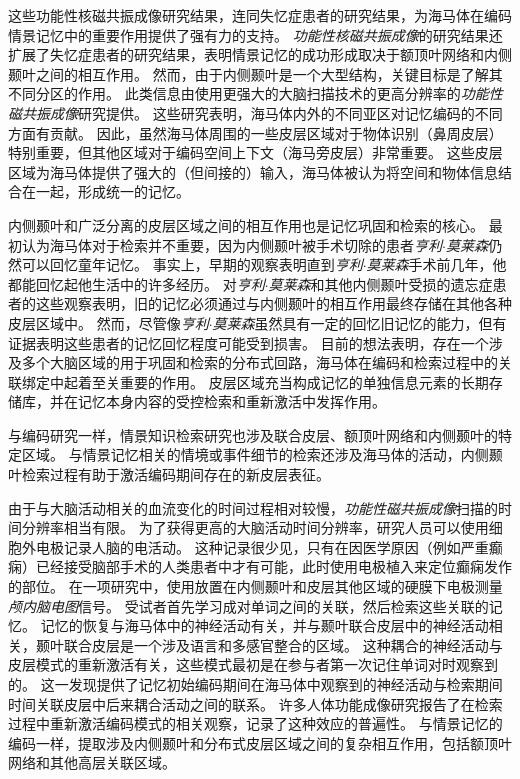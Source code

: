 这些功能性核磁共振成像研究结果，连同失忆症患者的研究结果，为海马体在编码情景记忆中的重要作用提供了强有力的支持。
\textit{功能性核磁共振成像}的研究结果还扩展了失忆症患者的研究结果，表明情景记忆的成功形成取决于额顶叶网络和内侧颞叶之间的相互作用。
然而，由于内侧颞叶是一个大型结构，关键目标是了解其不同分区的作用。
此类信息由使用更强大的大脑扫描技术的更高分辨率的\textit{功能性磁共振成像}研究提供。
这些研究表明，海马体内外的不同亚区对记忆编码的不同方面有贡献。
因此，虽然海马体周围的一些皮层区域对于物体识别（鼻周皮层）特别重要，但其他区域对于编码空间上下文（海马旁皮层）非常重要。
这些皮层区域为海马体提供了强大的（但间接的）输入，海马体被认为将空间和物体信息结合在一起，形成统一的记忆。


内侧颞叶和广泛分离的皮层区域之间的相互作用也是记忆巩固和检索的核心。
最初认为海马体对于检索并不重要，因为内侧颞叶被手术切除的患者\textit{亨利$\cdot$莫莱森}仍然可以回忆童年记忆。
事实上，早期的观察表明直到\textit{亨利$\cdot$莫莱森}手术前几年，他都能回忆起他生活中的许多经历。
对\textit{亨利$\cdot$莫莱森}和其他内侧颞叶受损的遗忘症患者的这些观察表明，旧的记忆必须通过与内侧颞叶的相互作用最终存储在其他各种皮层区域中。
然而，尽管像\textit{亨利$\cdot$莫莱森}虽然具有一定的回忆旧记忆的能力，但有证据表明这些患者的记忆回忆程度可能受到损害。
目前的想法表明，存在一个涉及多个大脑区域的用于巩固和检索的分布式回路，海马体在编码和检索过程中的关联绑定中起着至关重要的作用。
皮层区域充当构成记忆的单独信息元素的长期存储库，并在记忆本身内容的受控检索和重新激活中发挥作用。


与编码研究一样，情景知识检索研究也涉及联合皮层、额顶叶网络和内侧颞叶的特定区域。
与情景记忆相关的情境或事件细节的检索还涉及海马体的活动，内侧颞叶检索过程有助于激活编码期间存在的新皮层表征。


由于与大脑活动相关的血流变化的时间过程相对较慢，\textit{功能性磁共振成像}扫描的时间分辨率相当有限。
为了获得更高的大脑活动时间分辨率，研究人员可以使用细胞外电极记录人脑的电活动。
这种记录很少见，只有在因医学原因（例如严重癫痫）已经接受脑部手术的人类患者中才有可能，此时使用电极植入来定位癫痫发作的部位。
在一项研究中，使用放置在内侧颞叶和皮层其他区域的硬膜下电极测量\textit{颅内脑电图}信号。
受试者首先学习成对单词之间的关联，然后检索这些关联的记忆。
记忆的恢复与海马体中的神经活动有关，并与颞叶联合皮层中的神经活动相关，颞叶联合皮层是一个涉及语言和多感官整合的区域。
这种耦合的神经活动与皮层模式的重新激活有关，这些模式最初是在参与者第一次记住单词对时观察到的。
这一发现提供了记忆初始编码期间在海马体中观察到的神经活动与检索期间时间关联皮层中后来耦合活动之间的联系。
许多人体功能成像研究报告了在检索过程中重新激活编码模式的相关观察，记录了这种效应的普遍性。
与情景记忆的编码一样，提取涉及内侧颞叶和分布式皮层区域之间的复杂相互作用，包括额顶叶网络和其他高层关联区域。



